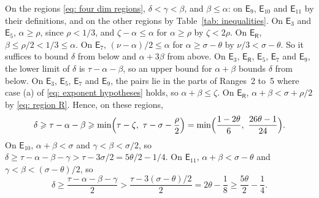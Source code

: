 \documentclass{article}
\numberwithin{equation}{section}
\newcommand{\Le}{\leqslant}
\newcommand{\Ge}{\geqslant}
\begin{document}
On the regions \eqref{eq: four dim regions}, $\delta < \gamma < \beta$, and $\beta \Le \alpha$: on $\mathsf{E}_9$, $\mathsf{E}_{10}$ and $\mathsf{E}_{11}$ by their definitions, and on the other regions by Table~\ref{tab: inequalities}. On $\mathsf{E}_3$ and $\mathsf{E}_5$, $\alpha \Ge \rho$, since $\rho < 1/3$, and $\zeta - \alpha \Le \alpha$ for $\alpha \Ge \rho$ by $\zeta < 2\rho$. On $\mathsf{E}_{\mathsf{R}}$, $\beta \Le \rho/2 < 1/3 \Le \alpha$. On $\mathsf{E}_7$, $(\nu - \alpha)/2 \Le \alpha$ for $\alpha \Ge \sigma - \theta$ by $\nu/3 < \sigma - \theta$. So it suffices to bound $\delta$ from below and $\alpha + 3\beta$ from above. On $\mathsf{E}_3$, $\mathsf{E}_{\mathsf{R}}$, $\mathsf{E}_5$, $\mathsf{E}_7$ and $\mathsf{E}_9$, the lower limit of $\delta$ is $\tau - \alpha - \beta$, so an upper bound for $\alpha + \beta$ bounds $\delta$ from below. On $\mathsf{E}_3$, $\mathsf{E}_5$, $\mathsf{E}_7$ and $\mathsf{E}_9$, the pairs lie in the parts of Ranges~2 to~5 where case (a) of \eqref{eq: exponent hypotheses} holds, so $\alpha + \beta \Le \zeta$. On $\mathsf{E}_{\mathsf{R}}$, $\alpha + \beta < \sigma + \rho/2$ by \eqref{eq: region R}. Hence, on these regions,
\begin{equation*}
\delta \Ge \tau - \alpha - \beta \Ge \min\Bigl( \tau - \zeta,\ \tau - \sigma - \frac{\rho}{2} \Bigr) = \min\Bigl( \frac{1 - 2\theta}{6},\ \frac{26\theta - 1}{24} \Bigr).
\end{equation*}
On $\mathsf{E}_{10}$, $\alpha + \beta < \sigma$ and $\gamma < \beta < \sigma/2$, so $\delta \Ge \tau - \alpha - \beta - \gamma > \tau - 3\sigma/2 = 5\theta/2 - 1/4$. On $\mathsf{E}_{11}$, $\alpha + \beta < \sigma - \theta$ and $\gamma < \beta < (\sigma - \theta)/2$, so
\begin{equation*}
\delta \Ge \frac{\tau - \alpha - \beta - \gamma}{2} > \frac{\tau - 3(\sigma - \theta)/2}{2} = 2\theta - \frac{1}{8} \Ge \frac{5\theta}{2} - \frac{1}{4}.
\end{equation*}
\end{document}
